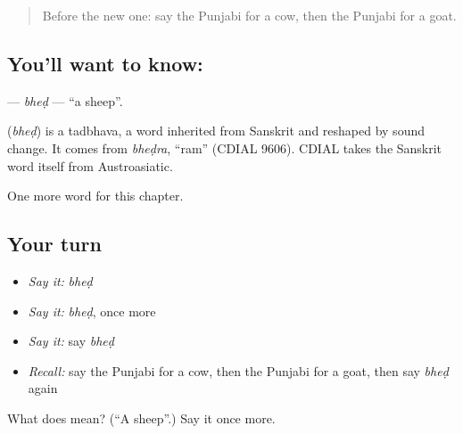 \label{lesson:PA-C77-bhed}



\begin{quote}
Before the new one: say the Punjabi for a cow, then the Punjabi for a goat.
\end{quote}

\subsection*{You'll want to know: }
\textbf{} — \emph{bheḍ} — \textquotedblleft{}a sheep\textquotedblright{}.

\begin{cousinweb}
\textbf{} (\emph{bheḍ}) is a tadbhava, a word inherited from Sanskrit and reshaped by sound change. It comes from \emph{bheḍra}, \textquotedblleft{}ram\textquotedblright{} (CDIAL 9606). CDIAL takes the Sanskrit word itself from Austroasiatic.
\end{cousinweb}

\begin{grammarlens}[title={What you've built}]
One more word for this chapter.
\end{grammarlens}

\subsection*{Your turn}
\begin{itemize}
\raggedright
  \item \emph{Say it:} \emph{bheḍ}
  \item \emph{Say it:} \emph{bheḍ}, once more
  \item \emph{Say it:} say \emph{bheḍ}
  \item \emph{Recall:} say the Punjabi for a cow, then the Punjabi for a goat, then say \emph{bheḍ} again
\end{itemize}

\begin{tcolorbox}[breakable,colback=teal!4,colframe=teal!35!black,title={Before you move on}]
What does  mean? (\textquotedblleft{}A sheep\textquotedblright{}.) Say it once more.
\end{tcolorbox}
